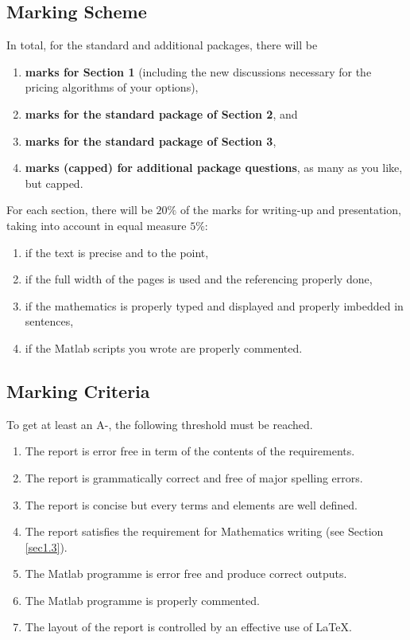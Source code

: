 \documentclass[12pt]{article}
\begin{document}
\subsection{Marking Scheme}

In total, for the standard and additional packages, there will be
\begin{enumerate}\item {\bf {} marks for Section 1} (including the new discussions necessary
for the pricing algorithms of your options),
\item {\bf{} marks for the standard package of Section 2}, and
\item {\bf{} marks for the standard package of Section 3},
\item {\bf{} marks (capped) for additional package questions}, as many as you like, but capped. \end{enumerate}

For each section, there will be $20\%$ of the marks for writing-up and presentation, taking into account
in equal measure $5\%$:
\begin{enumerate}\item if the text is precise and to the point,
\item if the full width of the pages is used and the referencing properly done,
\item if the mathematics is properly typed and displayed and properly
imbedded in sentences,
\item if the Matlab scripts you wrote are properly commented. \end{enumerate}

\subsection{Marking Criteria}

To get at least an A-, the following threshold must be reached.

\begin{enumerate}\item The report is error free in term of the contents of the requirements.
\item The report is grammatically correct and free of major spelling errors.
\item The report is concise but every terms and elements are well defined.
\item The report satisfies the requirement for Mathematics writing (see Section \ref{sec1.3}).
\item The Matlab programme is error free and produce correct outputs.
\item The Matlab programme is properly commented.
\item The layout of the report is controlled by an effective use of \LaTeX. \end{enumerate}
\end{document}
